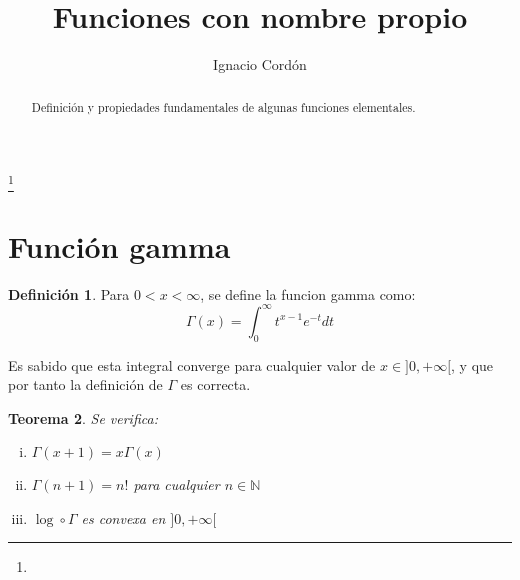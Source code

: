 \documentclass[a4paper, 11pt]{amsart}
\newtheorem{theorem}{Teorema}[section]
\theoremstyle{definition}
\newtheorem{definition}[theorem]{Definición}
\theoremstyle{remark}
\numberwithin{equation}{section}
\begin{document}
\title{Funciones con nombre propio}

\author{Ignacio Cordón}
\address{}
\curraddr{}
\email{}
\thanks{}


\keywords{}

\date{}

\dedicatory{}


\begin{abstract}
  Definición y propiedades fundamentales de algunas funciones elementales.
\end{abstract}

\maketitle

  \section{Función gamma}
  
  \begin{definition}
  Para $0 < x < \infty$, se define la funcion gamma como: 
    \begin{equation}
      \Gamma(x) = \int_0^{\infty}{t^{x-1}e^{-t}dt}
      \label{gamma}
    \end{equation}
  \end{definition}
  
  Es sabido que esta integral converge para cualquier valor de $x\in]0,+\infty[$, y que por tanto la definición de 
  $\Gamma$ es correcta.\\
  
  \begin{theorem}
    Se verifica:
      \begin{enumerate}[i.]
	\item $\Gamma(x+1) = x\Gamma(x)$
	\item $\Gamma(n+1) = n!$ para cualquier $n\in \mathbb{N}$
	\item $\log \circ \Gamma$ es convexa en $]0,+\infty[$
      \end{enumerate}
  \end{theorem}
  
\end{document}
